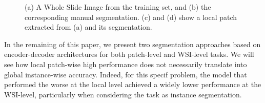 \begin{figure}[!t]
\centering
{}
\hfil
{}
\hfil
{}
\hfil
{}
\caption{(a) A Whole Slide Image from the training set, and (b) the corresponding manual segmentation. (c) and (d) show a local patch extracted from (a) and its segmentation.}
\label{fig1}
\end{figure}


In the remaining of this paper, we present two segmentation approaches based on encoder-decoder architectures for both patch-level and WSI-level tasks. 
We will see how local patch-wise high performance does not necessarily translate into global instance-wise accuracy. 
Indeed, for this specif problem, the model that performed the worse at the local level achieved a widely lower performance at the WSI-level, particularly when considering the task as instance segmentation. 

